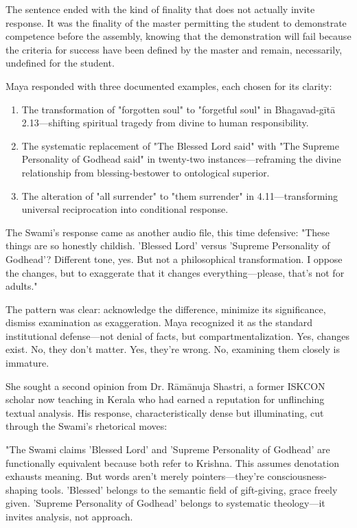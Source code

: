 \documentclass[12pt,twoside]{book}
\begin{document}
The sentence ended with the kind of finality that does not actually invite response. It was the finality of the master permitting the student to demonstrate competence before the assembly, knowing that the demonstration will fail because the criteria for success have been defined by the master and remain, necessarily, undefined for the student.

Maya responded with three documented examples, each chosen for its clarity:

\begin{enumerate}
\item The transformation of "forgotten soul" to "forgetful soul" in Bhagavad-gītā 2.13—shifting spiritual tragedy from divine to human responsibility.

\item The systematic replacement of "The Blessed Lord said" with "The Supreme Personality of Godhead said" in twenty-two instances—reframing the divine relationship from blessing-bestower to ontological superior.

\item The alteration of "all surrender" to "them surrender" in 4.11—transforming universal reciprocation into conditional response.
\end{enumerate}

The Swami's response came as another audio file, this time defensive: "These things are so honestly childish. 'Blessed Lord' versus 'Supreme Personality of Godhead'? Different tone, yes. But not a philosophical transformation. I oppose the changes, but to exaggerate that it changes everything—please, that's not for adults."

The pattern was clear: acknowledge the difference, minimize its significance, dismiss examination as exaggeration. Maya recognized it as the standard institutional defense—not denial of facts, but compartmentalization. Yes, changes exist. No, they don't matter. Yes, they're wrong. No, examining them closely is immature.

She sought a second opinion from Dr. Rāmānuja Shastri, a former ISKCON scholar now teaching in Kerala who had earned a reputation for unflinching textual analysis. His response, characteristically dense but illuminating, cut through the Swami's rhetorical moves:

"The Swami claims 'Blessed Lord' and 'Supreme Personality of Godhead' are functionally equivalent because both refer to Krishna. This assumes denotation exhausts meaning. But words aren't merely pointers—they're consciousness-shaping tools. 'Blessed' belongs to the semantic field of gift-giving, grace freely given. 'Supreme Personality of Godhead' belongs to systematic theology—it invites analysis, not approach.
\end{document}
